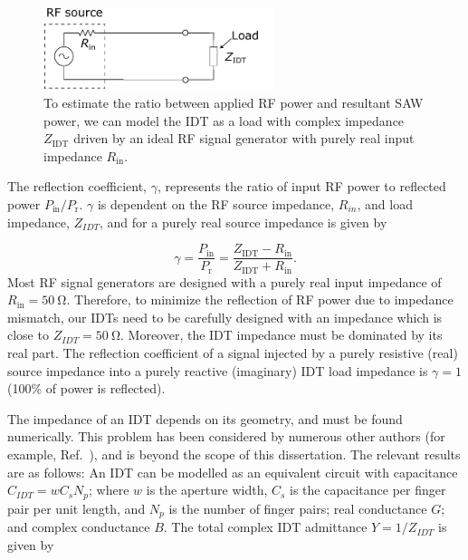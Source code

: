 \documentclass{beavtex_dub_edit}
\begin{document}
\begin{figure}
    \includegraphics[width = 0.6\textwidth]{IDT signal line model.pdf}
    \caption{To estimate the ratio between applied RF power and resultant SAW power, we can model the IDT as a load with complex impedance $Z_{\mathrm{IDT}}$ driven by an ideal RF signal generator with purely real input impedance $R_{\mathrm{in}}$.}
    \label{transmission line}
\end{figure}
The reflection coefficient, $\gamma$, represents the ratio of input RF power to reflected power $P_{\mathrm{in}}/P_{\mathrm{r}}$. $\gamma$ is dependent on the RF source impedance, $R_{in}$, and load impedance, $Z_{IDT}$, and for a purely real source impedance is given by \cite{kurokawa_power_1965}

\begin{equation}
    \gamma = \frac{P_{\mathrm{in}}}{P_{\mathrm{r}}} = \frac{Z_{\mathrm{IDT}} - R_{\mathrm{in}}}{Z_{\mathrm{IDT}} + R_{\mathrm{in}}}.
    \label{reflection coefficient}
\end{equation}
Most RF signal generators are designed with a purely real input impedance of $R_{\mathrm{in}} = \SI{50}{\ohm}$. Therefore, to minimize the reflection of RF power due to impedance mismatch, our IDTs need to be carefully designed with an impedance which is close to $Z_{IDT} = \SI{50}{\ohm}$. Moreover, the IDT impedance must be dominated by its real part. The reflection coefficient of a signal injected by a purely resistive (real) source impedance into a purely reactive (imaginary) IDT load impedance is $\gamma = 1$ (100\% of power is reflected).

The impedance of an IDT depends on its geometry, and must be found numerically. This problem has been considered by numerous other authors (for example, Ref.\ \cite{smith_analysis_1969}), and is beyond the scope of this dissertation. The relevant results are as follows: An IDT can be modelled as an equivalent circuit with capacitance $C_{IDT} = w C_s N_p$; where $w$ is the aperture width, $C_s$ is the capacitance per finger pair per unit length, and $N_p$ is the number of finger pairs; real conductance $G$; and complex conductance $B$. The total complex IDT admittance $Y = 1/Z_{IDT}$ is given by 
\end{document}
